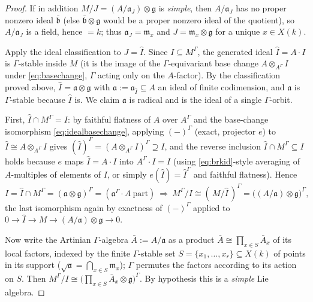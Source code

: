 \documentclass{amsart}
\theoremstyle{definition}
\newcommand{\g}{\mathfrak{g}}
\newcommand{\M}{M}
\begin{document}
\begin{proof}
If in addition $\M/J=(A/\mathfrak a_J)\otimes\g$ is \emph{simple}, then
$A/\mathfrak a_J$ has no proper nonzero ideal $\bar{\mathfrak b}$ (else
$\bar{\mathfrak b}\otimes\g$ would be a proper nonzero ideal of the
quotient), so $A/\mathfrak a_J$ is a field, hence $=k$; thus
$\mathfrak a_J=\mathfrak m_x$ and $J=\mathfrak m_x\otimes\g$ for a unique
$x\in X(k)$.

Apply the ideal classification to $J=\widehat I$.  Since $I\subseteq\M^\Gamma$,
the generated ideal $\widehat I=A\cdot I$ is $\Gamma$-stable inside $\M$ (it is
the image of the $\Gamma$-equivariant base change $A\otimes_{A^\Gamma}I$ under
\eqref{eq:basechange}, $\Gamma$ acting only on the $A$-factor).  By the
classification proved above, $\widehat I=\mathfrak a\otimes\g$ with
$\mathfrak a:=\mathfrak a_{\widehat I}\subseteq A$ an ideal of finite
codimension, and $\mathfrak a$ is $\Gamma$-stable because $\widehat I$ is.  We
claim $\mathfrak a$ is radical and is the ideal of a single $\Gamma$-orbit.

First, $\widehat I\cap\M^\Gamma=I$: by faithful flatness of $A$ over
$A^\Gamma$ and the base-change isomorphism \eqref{eq:idealbasechange}, applying
$(-)^\Gamma$ (exact, projector $e$) to $\widehat I\cong A\otimes_{A^\Gamma}I$
gives $(\widehat I)^\Gamma=(A\otimes_{A^\Gamma}I)^\Gamma\supseteq I$, and the
reverse inclusion $\widehat I\cap\M^\Gamma\subseteq I$ holds because $e$ maps
$\widehat I=A\cdot I$ into $A^\Gamma\cdot I=I$ (using
\eqref{eq:brkid}-style averaging of $A$-multiples of elements of $I$, or simply
$e(\widehat I)=\widehat I^\Gamma$ and faithful flatness).  Hence
\begin{equation}\label{eq:Irecover}
I=\widehat I\cap\M^\Gamma=(\mathfrak a\otimes\g)^\Gamma
=(\mathfrak a^\Gamma\!\cdot A\ \text{part})\ \Longrightarrow\
\M^\Gamma/I\cong(\,\M/\widehat I\,)^\Gamma=\bigl((A/\mathfrak a)\otimes\g\bigr)^\Gamma,
\end{equation}
the last isomorphism again by exactness of $(-)^\Gamma$ applied to
$0\to\widehat I\to\M\to(A/\mathfrak a)\otimes\g\to0$.

Now write the Artinian $\Gamma$-algebra $\bar A:=A/\mathfrak a$ as a product
$\bar A\cong\prod_{x\in S}\bar A_x$ of its local factors, indexed by the finite
$\Gamma$-stable set $S=\{x_1,\dots,x_r\}\subseteq X(k)$ of points in its support
($\sqrt{\mathfrak a}=\bigcap_{x\in S}\mathfrak m_x$); $\Gamma$ permutes the
factors according to its action on $S$.  Then
$\M^\Gamma/I\cong\bigl(\prod_{x\in S}\bar A_x\otimes\g\bigr)^\Gamma$.
By hypothesis this is a \emph{simple} Lie algebra.


\end{proof}
\end{document}
